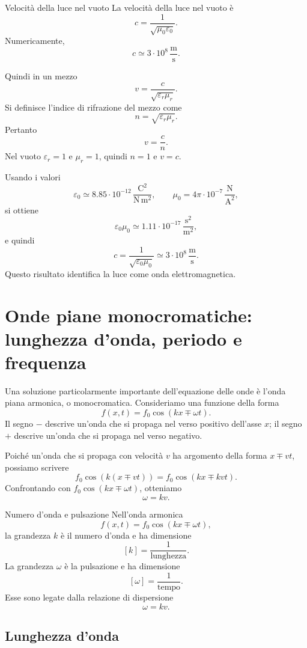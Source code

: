 \documentclass[a4paper]{article}
\begin{document}
\begin{snippetdefinition}{Velocità della luce nel vuoto}
La velocità della luce nel vuoto è
\[
    c=\frac{1}{\sqrt{\mu_0\varepsilon_0}}.
\]
Numericamente,
\[
    c\simeq 3\cdot 10^8\,\frac{\mathrm{m}}{\mathrm{s}}.
\]
\end{snippetdefinition}

Quindi in un mezzo
\[
v=\frac{c}{\sqrt{\varepsilon_r\mu_r}}.
\]
Si definisce l'indice di rifrazione del mezzo come
\[
n=\sqrt{\varepsilon_r\mu_r}.
\]
Pertanto
\[
v=\frac{c}{n}.
\]
Nel vuoto \(\varepsilon_r=1\) e \(\mu_r=1\), quindi \(n=1\) e \(v=c\).

Usando i valori
\[
\varepsilon_0\simeq 8.85\cdot 10^{-12}\,\frac{\mathrm{C}^2}{\mathrm{N}\,\mathrm{m}^2},
\qquad
\mu_0=4\pi\cdot 10^{-7}\,\frac{\mathrm{N}}{\mathrm{A}^2},
\]
si ottiene
\[
\varepsilon_0\mu_0\simeq 1.11\cdot 10^{-17}\,\frac{\mathrm{s}^2}{\mathrm{m}^2},
\]
e quindi
\[
c=\frac{1}{\sqrt{\varepsilon_0\mu_0}}\simeq 3\cdot 10^8\,\frac{\mathrm{m}}{\mathrm{s}}.
\]
Questo risultato identifica la luce come onda elettromagnetica.

\section{Onde piane monocromatiche: lunghezza d'onda, periodo e frequenza}

Una soluzione particolarmente importante dell'equazione delle onde è l'onda piana armonica, o monocromatica. Consideriamo una funzione della forma
\[
f(x,t)=f_0\cos(kx\mp\omega t).
\]
Il segno \(-\) descrive un'onda che si propaga nel verso positivo dell'asse \(x\); il segno \(+\) descrive un'onda che si propaga nel verso negativo.

Poiché un'onda che si propaga con velocità \(v\) ha argomento della forma \(x\mp vt\), possiamo scrivere
\[
f_0\cos\left(k(x\mp vt)\right)=f_0\cos(kx\mp kvt).
\]
Confrontando con \(f_0\cos(kx\mp\omega t)\), otteniamo
\[
\omega=kv.
\]

\begin{snippetdefinition}{Numero d'onda e pulsazione}
Nell'onda armonica
\[
    f(x,t)=f_0\cos(kx\mp\omega t),
\]
la grandezza \(k\) è il numero d'onda e ha dimensione
\[
    [k]=\frac{1}{\text{lunghezza}}.
\]
La grandezza \(\omega\) è la pulsazione e ha dimensione
\[
    [\omega]=\frac{1}{\text{tempo}}.
\]
Esse sono legate dalla relazione di dispersione
\[
    \omega=kv.
\]
\end{snippetdefinition}

\subsection{Lunghezza d'onda}
\end{document}
